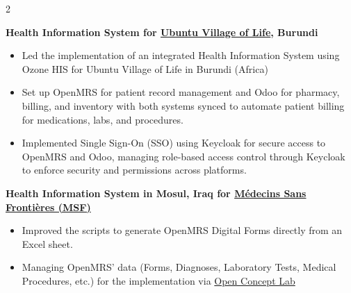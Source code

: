 \documentclass[8pt,a4paper,normalphoto]{altacv}
\begin{document}
\begin{paracol}{2}


\href{mailto:ian.c.bacher@gmail.com}{}


\href{mailto:dennis@openmrs.org}{}


\href{mailto:jayasanka@openmrs.org}{}


\switchcolumn



\textbf{Health Information System for \href{https://www.msf.org/}{Ubuntu Village of Life}, Burundi}
\begin{itemize}
    \item Led the implementation of an integrated Health Information System using Ozone HIS for Ubuntu Village of Life in Burundi (Africa)
    \item Set up OpenMRS for patient record management and Odoo for pharmacy, billing, and inventory with both systems synced to automate patient billing for medications, labs, and procedures.
    \item Implemented Single Sign-On (SSO) using Keycloak for secure access to OpenMRS and Odoo, managing role-based access control through Keycloak to enforce security and permissions across platforms.
\end{itemize}

\smallskip

\textbf{Health Information System in Mosul, Iraq for \href{https://www.msf.org/}{Médecins Sans Frontières (MSF)}}

\begin{itemize}
    \item Improved the scripts to generate OpenMRS Digital Forms directly from an Excel sheet.
    \item Managing OpenMRS' data (Forms, Diagnoses, Laboratory Tests, Medical Procedures, etc.) for the implementation via \href{https://openconceptlab.org/}{Open Concept Lab}


\end{itemize}
\end{paracol}
\end{document}
